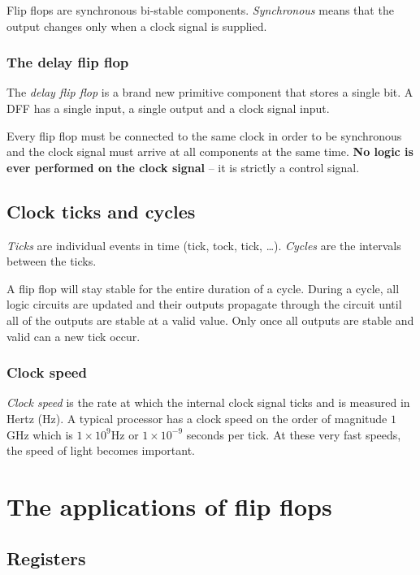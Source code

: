 Flip flops are synchronous bi-stable components.
\emph{Synchronous} means that the output changes only when a clock signal is supplied.

\subsubsection{The delay flip flop}\label{ssub:the_delay_flip_flop}

The \emph{delay flip flop} is a brand new primitive component that stores a single bit.
A DFF has a single input, a single output and a clock signal input.

Every flip flop must be connected to the same clock in order to be synchronous and the clock signal must arrive at all components at the same time.
\textbf{No logic is ever performed on the clock signal} -- it is strictly a control signal.

\subsection{Clock ticks and cycles}\label{sub:clock_ticks_and_cycles}

\emph{Ticks} are individual events in time (tick, tock, tick, \ldots).
\emph{Cycles} are the intervals between the ticks.

A flip flop will stay stable for the entire duration of a cycle.
During a cycle, all logic circuits are updated and their outputs propagate through the circuit until all of the outputs are stable at a valid value.
Only once all outputs are stable and valid can a new tick occur.

\subsubsection{Clock speed}\label{ssub:clock_speed}

\emph{Clock speed} is the rate at which the internal clock signal ticks and is measured in Hertz (Hz).
A typical processor has a clock speed on the order of magnitude \(1\)GHz which is \(1\times 10^{9}\)Hz or \(1\times 10^{-9}\) seconds per tick.
At these very fast speeds, the speed of light becomes important.

\section{The applications of flip flops}\label{sec:the_applications_of_flip_flops}

\subsection{Registers}\label{sub:registers}

